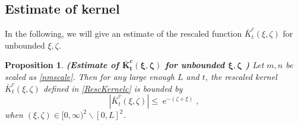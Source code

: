 \documentclass[cmp]{svjour}
\numberwithin{theorem}{section}
\numberwithin{equation}{section}
\DeclareMathOperator{\e}{e}
\def\i{{\infty}}
\newtheorem{prop}[theorem]{Proposition}
\begin{document}
\medskip


\subsection{Estimate of kernel}\label{Sec:KernelEstimate}
In the following, we will give an estimate of the rescaled function $\bar{K}^c_t(\xi, \zeta)$ for unbounded $\xi,\zeta$.

\medskip


\begin{prop}
	\label{exp_bound}
	{\rm \textbf{(Estimate of  $\boldsymbol{\bar{K}_t^{c}(\xi , \zeta)}$ for unbounded $\boldsymbol{\xi , \zeta}$ )} }
	Let $m,n$ be scaled as \eqref{nmscale}. Then for any large enough $L$ and $t$, the rescaled kernel $\bar{K}_t^{c}(\xi , \zeta)$ defined in \eqref{RescKernelc} is bounded by
	\begin{equation}
		\left| \bar{K}_t^{c}(\xi , \zeta) \right| \leq \e^{-(\zeta + \xi)},
	\end{equation}
	when $(\xi , \zeta) \in [0, \i )^2 \backslash [0 , L]^2$.	
\end{prop}
\end{document}
